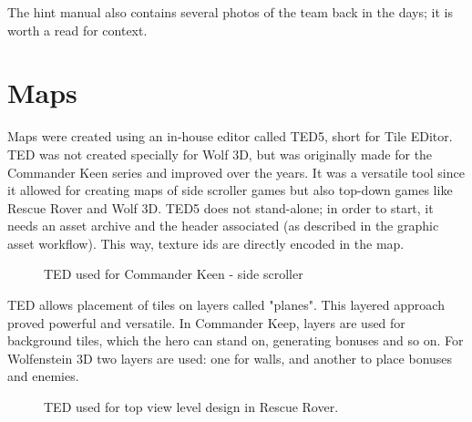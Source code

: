 \documentclass[book.tex]{subfiles}
\begin{document}
     \begin{figure}[H]
\centering
   \end{figure}


\par 
The hint manual also contains several photos of the team back in the days; it is worth a read for context.













\section{Maps}
Maps were created using an in-house editor called TED5, short for Tile EDitor. TED was not created specially for Wolf 3D, but was originally made for the Commander Keen series and improved over the years. It was a versatile tool since it allowed for creating maps of side scroller games but also top-down games like Rescue Rover and Wolf 3D. TED5 does not stand-alone; in order to start, it needs an asset archive and the header associated (as described in the graphic asset workflow). This way, texture ids are directly encoded in the map.\\

 \begin{figure}[H]
\centering
 \end{figure}

  \begin{figure}[H]
\centering
 \end{figure}


 \begin{figure}[H]
\centering
 \caption{TED used for Commander Keen - side scroller} 
 \end{figure}

TED allows placement of tiles on layers called "planes". This layered approach proved powerful and versatile. In Commander Keep, layers are used for background tiles, which the hero can stand on, generating bonuses and so on. For Wolfenstein 3D two layers are used: one for walls, and another to place bonuses and enemies.\\
\begin{figure}[H]
\centering
 \caption{TED used for top view level design in Rescue Rover.} 
 \end{figure}
\end{document}
